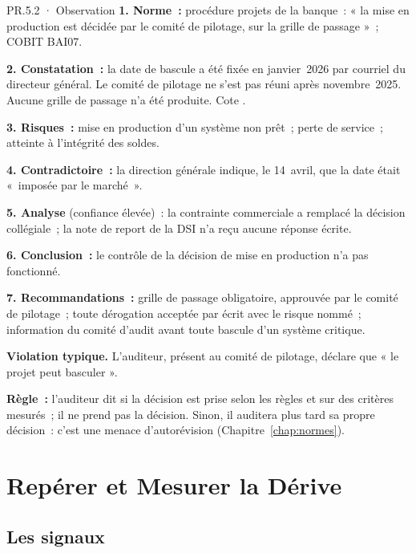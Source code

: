 \begin{boxobjet}{PR.5.2 · Observation}
\textbf{1. Norme~:} procédure projets de la banque~: « la mise en
production est décidée par le comité de pilotage, sur la grille de
passage »~; COBIT BAI07.

\textbf{2. Constatation~:} la date de bascule a été fixée en janvier~2026
par courriel du directeur général. Le comité de pilotage ne s'est pas
réuni après novembre~2025. Aucune grille de passage n'a été produite.
Cote \NON{}.

\textbf{3. Risques~:} mise en production d'un système non prêt~; perte de
service~; atteinte à l'intégrité des soldes.

\textbf{4. Contradictoire~:} la direction générale indique, le 14~avril,
que la date était «~imposée par le marché~».

\textbf{5. Analyse} (confiance élevée)~: la contrainte commerciale a
remplacé la décision collégiale~; la note de report de la DSI n'a reçu
aucune réponse écrite.

\textbf{6. Conclusion~:} le contrôle de la décision de mise en production
n'a pas fonctionné.

\textbf{7. Recommandations~:} grille de passage obligatoire, approuvée par
le comité de pilotage~; toute dérogation acceptée par écrit avec le risque
nommé~; information du comité d'audit avant toute bascule d'un système
critique.
\end{boxobjet}

\begin{boxalert}
\textbf{Violation typique.} L'auditeur, présent au comité de pilotage,
déclare que « le projet peut basculer ».

\smallskip
\textbf{Règle~:} l'auditeur dit si la décision est prise selon les règles
et sur des critères mesurés~; il ne prend pas la décision. Sinon, il
auditera plus tard sa propre décision~: c'est une menace
d'autorévision (Chapitre~\ref{chap:normes}).
\end{boxalert}

\section{Repérer et Mesurer la Dérive}
\label{sec:c15-derive}

\subsection{Les signaux}

